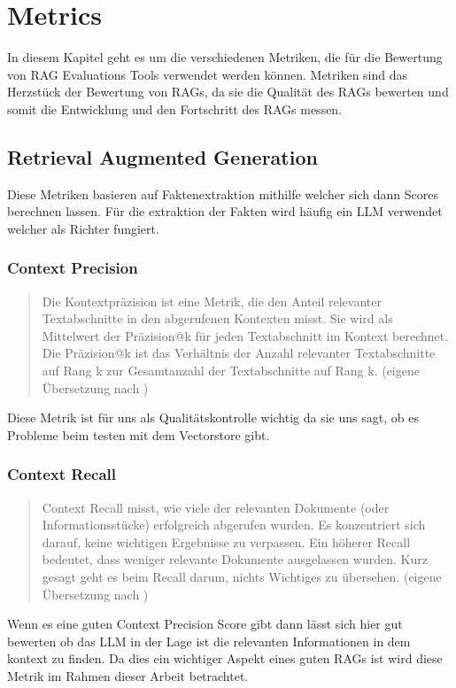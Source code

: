 \chapter{Metrics}

\label{chap:formal}
In diesem Kapitel geht es um die verschiedenen Metriken, die für die Bewertung von RAG Evaluations Tools verwendet werden können.
Metriken sind das Herzstück der Bewertung von RAGs, da sie die Qualität des RAGs bewerten und somit die Entwicklung und den Fortschritt des RAGs messen.


\section{Retrieval Augmented Generation}
Diese Metriken basieren auf Faktenextraktion mithilfe welcher sich dann Scores berechnen lassen.
Für die extraktion der Fakten wird häufig ein LLM verwendet welcher als Richter fungiert.


\subsection{Context Precision}
\begin{quote}
Die Kontextpräzision ist eine Metrik, die den Anteil relevanter Textabschnitte in den abgerufenen Kontexten misst.
Sie wird als Mittelwert der Präzision@k für jeden Textabschnitt im Kontext berechnet.
Die Präzision@k ist das Verhältnis der Anzahl relevanter Textabschnitte auf Rang k zur Gesamtanzahl der Textabschnitte auf Rang k.
(eigene Übersetzung nach \cite{ragas_context_precision})
\end{quote}
Diese Metrik ist für uns als Qualitätskontrolle wichtig da sie uns sagt, ob es Probleme beim testen mit dem Vectorstore gibt.

\subsection{Context Recall}
\begin{quote}
Context Recall misst, wie viele der relevanten Dokumente (oder Informationsstücke) erfolgreich abgerufen wurden.
Es konzentriert sich darauf, keine wichtigen Ergebnisse zu verpassen.
Ein höherer Recall bedeutet, dass weniger relevante Dokumente ausgelassen wurden.
Kurz gesagt geht es beim Recall darum, nichts Wichtiges zu übersehen.
(eigene Übersetzung nach \cite{ragas_context_recall})
\end{quote}

Wenn es eine guten Context Precision Score gibt dann lässt sich hier gut bewerten ob das LLM in der Lage ist die relevanten Informationen in dem kontext zu finden.
Da dies ein wichtiger Aspekt eines guten RAGs ist wird diese Metrik im Rahmen dieser Arbeit betrachtet.

